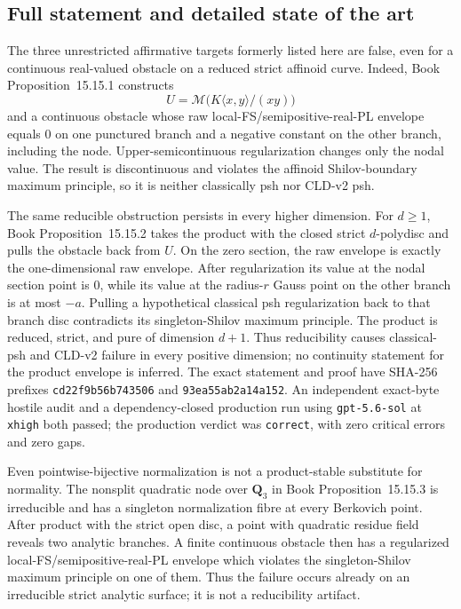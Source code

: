 \documentclass[11pt,a4paper]{article}
\theoremstyle{definition}
\theoremstyle{remark}
\begin{document}
\subsection{Full statement and detailed state of the art}
\label{sec:ch72-local-envelope}

The three unrestricted affirmative targets formerly listed here are false,
even for a continuous real-valued obstacle on a reduced strict affinoid curve.
Indeed, Book Proposition~15.15.1 constructs
\[
 U=\mathcal M\bigl(K\langle x,y\rangle/(xy)\bigr)
\]
and a continuous obstacle whose raw local-FS/semipositive-real-PL envelope
equals \(0\) on one punctured branch and a negative constant on the other
branch, including the node.  Upper-semicontinuous regularization changes only
the nodal value.  The result is discontinuous and violates the affinoid
Shilov-boundary maximum principle, so it is neither classically psh nor
CLD-v2 psh.

The same reducible obstruction persists in every higher dimension.  For
\(d\geq1\), Book Proposition~15.15.2
takes the product with the closed strict \(d\)-polydisc and pulls the
obstacle back from \(U\).  On the zero section, the raw envelope is exactly
the one-dimensional raw envelope.  After regularization its value at the
nodal section point is \(0\), while its value at the radius-\(r\) Gauss point
on the other branch is at most \(-a\).  Pulling a hypothetical classical psh
regularization back to that branch disc contradicts its singleton-Shilov
maximum principle.  The product is reduced, strict, and pure of dimension
\(d+1\).  Thus reducibility causes classical-psh and CLD-v2 failure in every
positive dimension; no continuity statement for the product envelope is
inferred.  The exact statement and proof have SHA-256 prefixes
\texttt{cd22f9b56b743506} and \texttt{93ea55ab2a14a152}.  An independent
exact-byte hostile audit and a dependency-closed production run using
\texttt{gpt-5.6-sol} at \texttt{xhigh} both passed; the production verdict
was \texttt{correct}, with zero critical errors and zero gaps.

Even pointwise-bijective normalization is not a product-stable substitute
for normality.  The nonsplit quadratic node over \(\mathbf Q_3\) in
Book Proposition~15.15.3 is irreducible
and has a singleton normalization fibre at every Berkovich point.  After
product with the strict open disc, a point with quadratic residue field
reveals two analytic branches.  A finite continuous obstacle then has a
regularized local-FS/semipositive-real-PL envelope which violates the
singleton-Shilov maximum principle on one of them.  Thus the failure occurs
already on an irreducible strict analytic surface; it is not a reducibility
artifact.
\end{document}
